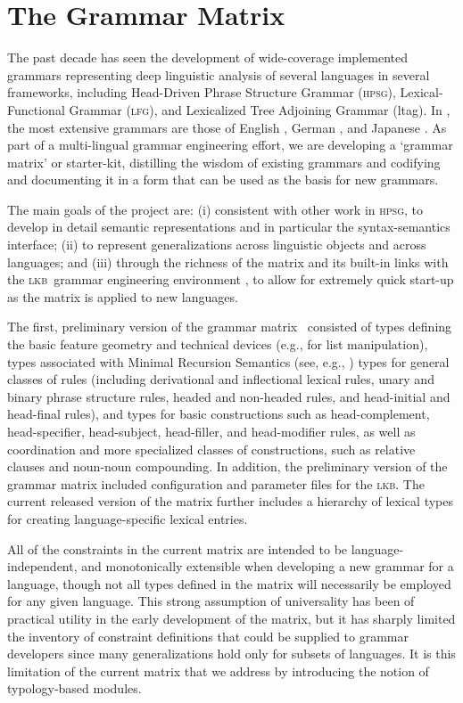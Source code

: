 \documentclass[11pt]{article}
\newcommand{\hpsg}{\textsc{hpsg}}
\newcommand{\lkb}{\textsc{lkb}}
\newcommand{\lfg}{\textsc{lfg}}
\begin{document}
\section{The Grammar Matrix}

The past decade has seen the development of wide-coverage implemented
grammars representing deep linguistic analysis of several languages in
several frameworks, including Head-Driven Phrase Structure Grammar
(\hpsg), Lexical-Functional Grammar (\lfg), and Lexicalized Tree
Adjoining Grammar ({\sc ltag}). In , the most extensive grammars
are those of English \cite{Flickinger:00}, German \cite{Mue:Kap:00},
and Japanese \cite{Siegel:00,Siegel:Bender:02}.  As part of a
multi-lingual grammar engineering effort, we are developing a `grammar
matrix' or starter-kit, distilling the wisdom of existing grammars and
codifying and documenting it in a form that can be used as the basis
for new grammars.

The main goals of the project are: (i) consistent with other work in
\hpsg, to develop in detail semantic representations and in particular
the syntax-semantics interface; (ii) to represent generalizations
across linguistic objects and across languages; and (iii) through the
richness of the matrix and its built-in links with
the \lkb\ grammar engineering environment \cite{Copestake:02}, to
allow for extremely quick start-up as the matrix is applied to new
languages.

The first, preliminary version of the grammar matrix~\cite{Ben:Fli:Oe:02}
consisted of types defining the basic feature geometry and technical
devices (e.g., for list manipulation), types associated with Minimal
Recursion Semantics (see, e.g., \cite{Cop:Las:Fli:01}) types for
general classes of rules (including derivational and inflectional
lexical rules, unary and binary phrase structure rules, headed and
non-headed rules, and head-initial and head-final rules), and types
for basic constructions such as head-complement, head-specifier,
head-subject, head-filler, and head-modifier rules, as well as 
coordination and more specialized classes of constructions, such as relative
clauses and noun-noun compounding.  In addition, the preliminary
version of the grammar matrix included configuration and parameter
files for the \lkb.  The current released version of the matrix further 
includes a hierarchy of lexical types for creating language-specific 
lexical entries.

All of the constraints in the current matrix are intended to be 
language-independent, and monotonically extensible when developing a
new grammar for a language, though not all types defined in the matrix
will necessarily be employed for any given language.  This strong 
assumption of universality has been of practical utility in the early
development of the matrix, but it has sharply limited the inventory of
constraint definitions that could be supplied to grammar developers
since many generalizations hold only for subsets of languages.  It is
this limitation of the current matrix that we address by introducing
the notion of typology-based modules.
\end{document}

